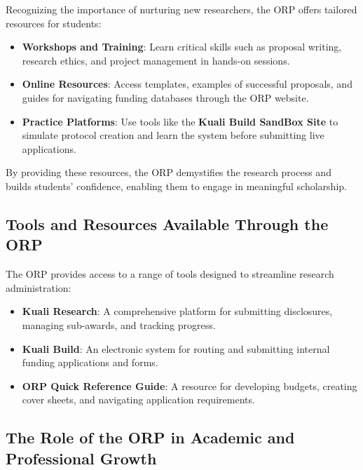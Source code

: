 \documentclass[
]{book}
\providecommand{\tightlist}{%
  \setlength{\itemsep}{0pt}\setlength{\parskip}{0pt}}
\begin{document}
Recognizing the importance of nurturing new researchers, the ORP offers tailored resources for students:

\begin{itemize}
\tightlist
\item
  \textbf{Workshops and Training}: Learn critical skills such as proposal writing, research ethics, and project management in hands-on sessions.
\item
  \textbf{Online Resources}: Access templates, examples of successful proposals, and guides for navigating funding databases through the ORP website.
\item
  \textbf{Practice Platforms}: Use tools like the \textbf{Kuali Build SandBox Site} to simulate protocol creation and learn the system before submitting live applications.
\end{itemize}

By providing these resources, the ORP demystifies the research process and builds students' confidence, enabling them to engage in meaningful scholarship.

\subsection*{Tools and Resources Available Through the ORP}\label{tools-and-resources-available-through-the-orp}

The ORP provides access to a range of tools designed to streamline research administration:

\begin{itemize}
\tightlist
\item
  \textbf{Kuali Research}: A comprehensive platform for submitting disclosures, managing sub-awards, and tracking progress.
\item
  \textbf{Kuali Build}: An electronic system for routing and submitting internal funding applications and forms.
\item
  \textbf{ORP Quick Reference Guide}: A resource for developing budgets, creating cover sheets, and navigating application requirements.
\end{itemize}

\subsection*{The Role of the ORP in Academic and Professional Growth}\label{the-role-of-the-orp-in-academic-and-professional-growth}
\end{document}
